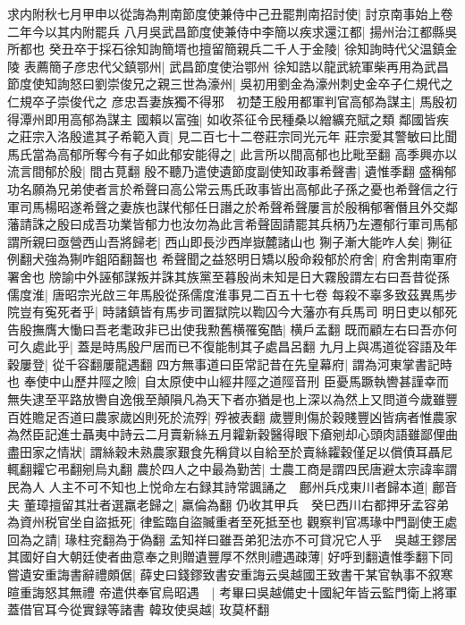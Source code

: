 求内附秋七月甲申以從誨為荆南節度使兼侍中己丑罷荆南招討使|{
	討京南事始上卷二年今以其内附罷兵}
八月吳武昌節度使兼侍中李簡以疾求還江都|{
	揚州治江都縣吳所都也}
癸丑卒于採石徐知詢簡壻也擅留簡親兵二千人于金陵|{
	徐知詢時代父温鎮金陵}
表薦簡子彦忠代父鎮鄂州|{
	武昌節度使治鄂州}
徐知誥以龍武統軍柴再用為武昌節度使知詢怒曰劉崇俊兄之親三世為濠州|{
	吳初用劉金為濠州刺史金卒子仁規代之仁規卒子崇俊代之}
彦忠吾妻族獨不得邪　初楚王殷用都軍判官高郁為謀主|{
	馬殷初得潭州即用高郁為謀主}
國賴以富強|{
	如收茶征令民種桑以繒纊充賦之類}
鄰國皆疾之莊宗入洛殷遣其子希範入貢|{
	見二百七十二卷莊宗同光元年}
莊宗愛其警敏曰比聞馬氏當為高郁所奪今有子如此郁安能得之|{
	此言所以間高郁也比毗至翻}
高季興亦以流言間郁於殷|{
	間古莧翻}
殷不聽乃遣使遺節度副使知政事希聲書|{
	遺惟季翻}
盛稱郁功名願為兄弟使者言於希聲曰高公常云馬氏政事皆出高郁此子孫之憂也希聲信之行軍司馬楊昭遂希聲之妻族也謀代郁任日譖之於希聲希聲屢言於殷稱郁奢僭且外交鄰藩請誅之殷曰成吾功業皆郁力也汝勿為此言希聲固請罷其兵柄乃左遷郁行軍司馬郁謂所親曰亟營西山吾將歸老|{
	西山即長沙西岸嶽麓諸山也}
猘子漸大能咋人矣|{
	猘征例翻犬強為猘咋鉏陌翻齧也}
希聲聞之益怒明日矯以殷命殺郁於府舍|{
	府舍荆南軍府署舍也}
牓諭中外誣郁謀叛并誅其族黨至暮殷尚未知是日大霧殷謂左右曰吾昔從孫儒度淮|{
	唐昭宗光啟三年馬殷從孫儒度淮事見二百五十七卷}
每殺不辜多致茲異馬步院豈有寃死者乎|{
	時諸鎮皆有馬步司置獄院以鞫囚今大藩亦有兵馬司}
明日吏以郁死告殷撫膺大慟曰吾老耄政非已出使我勲舊横罹寃酷|{
	横戶孟翻}
既而顧左右曰吾亦何可久處此乎|{
	蓋是時馬殷尸居而已不復能制其子處昌呂翻}
九月上與馮道從容語及年穀屢登|{
	從千容翻屢龍遇翻}
四方無事道曰臣常記昔在先皇幕府|{
	謂為河東掌書記時也}
奉使中山歷井陘之險|{
	自太原使中山經井陘之道陘音刑}
臣憂馬蹶執轡甚謹幸而無失逮至平路放轡自逸俄至顛隕凡為天下者亦猶是也上深以為然上又問道今歲雖豐百姓贍足否道曰農家歲凶則死於流殍|{
	殍被表翻}
歲豐則傷於穀賤豐凶皆病者惟農家為然臣記進士聶夷中詩云二月賣新絲五月糶新穀醫得眼下瘡剜却心頭肉語雖鄙俚曲盡田家之情狀|{
	謂絲穀未熟農家艱食先稱貸以自給至於賣絲糶穀僅足以償債耳聶尼輒翻糶它弔翻剜烏丸翻}
農於四人之中最為勤苦|{
	士農工商是謂四民唐避太宗諱率謂民為人}
人主不可不知也上悦命左右録其詩常諷誦之　鄜州兵戍東川者歸本道|{
	鄜音夫}
董璋擅留其壯者選羸老歸之|{
	羸倫為翻}
仍收其甲兵　癸巳西川右都押牙孟容弟為資州税官坐自盜抵死|{
	律監臨自盜贓重者至死抵至也}
觀察判官馮瑑中門副使王處回為之請|{
	瑑柱兖翻為于偽翻}
孟知祥曰雖吾弟犯法亦不可貸况它人乎　吳越王鏐居其國好自大朝廷使者曲意奉之則贈遺豐厚不然則禮遇疎薄|{
	好呼到翻遺惟季翻下同}
嘗遺安重誨書辭禮頗倨|{
	薛史曰錢鏐致書安重誨云吳越國王致書干某官執事不叙寒暄重誨怒其無禮}
帝遣供奉官烏昭遇　|{
	考畢曰吳越備史十國紀年皆云監門衛上將軍蓋借官耳今從實録等諸書}
韓玫使吳越|{
	玫莫杯翻}
